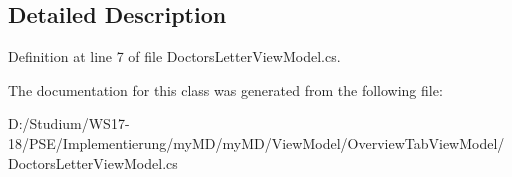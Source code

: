 \subsection{Detailed Description}




Definition at line 7 of file Doctors\-Letter\-View\-Model.cs.

The documentation for this class was generated from the following file:\begin{CompactItemize}
\item 
D:/Studium/WS17-18/PSE/Implementierung/my\-MD/my\-MD/View\-Model/Overview\-Tab\-View\-Model/Doctors\-Letter\-View\-Model.cs\end{CompactItemize}
